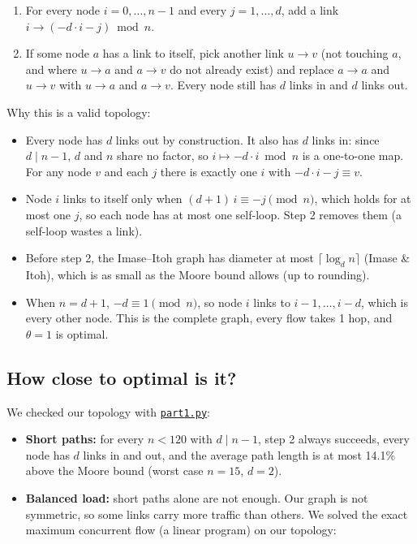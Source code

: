 \begin{enumerate}
  \item For every node $i = 0, \dots, n-1$ and every $j = 1, \dots, d$, add a link
        $i \rightarrow (-d \cdot i - j) \bmod n$.
  \item If some node $a$ has a link to itself, pick another link $u \rightarrow v$ (not touching
        $a$, and where $u \rightarrow a$ and $a \rightarrow v$ do not already exist) and replace
        $a \rightarrow a$ and $u \rightarrow v$ with $u \rightarrow a$ and $a \rightarrow v$.
        Every node still has $d$ links in and $d$ links out.
\end{enumerate}

Why this is a valid topology:
\begin{itemize}
  \item Every node has $d$ links out by construction. It also has $d$ links in: since $d \mid n-1$,
        $d$ and $n$ share no factor, so $i \mapsto -d \cdot i \bmod n$ is a one-to-one map. For any
        node $v$ and each $j$ there is exactly one $i$ with $-d \cdot i - j \equiv v$.
  \item Node $i$ links to itself only when $(d+1)\,i \equiv -j \pmod n$, which holds for at most one
        $j$, so each node has at most one self-loop. Step 2 removes them (a self-loop wastes a link).
  \item Before step 2, the Imase--Itoh graph has diameter at most $\lceil \log_d n \rceil$ (Imase \& Itoh),
        which is as small as the Moore bound allows (up to rounding).
  \item When $n = d + 1$, $-d \equiv 1 \pmod n$, so node $i$ links to $i-1, \dots, i-d$, which is every
        other node. This is the complete graph, every flow takes 1 hop, and $\theta = 1$ is optimal.
\end{itemize}

\subsection*{How close to optimal is it?}

We checked our topology with \href{\code/part1.py\#L72-L95}{\texttt{part1.py}}:
\begin{itemize}
  \item \textbf{Short paths:} for every $n < 120$ with $d \mid n-1$, step 2 always succeeds, every
        node has $d$ links in and out, and the average path length is at most 14.1\% above the
        Moore bound (worst case $n = 15$, $d = 2$).
  \item \textbf{Balanced load:} short paths alone are not enough. Our graph is not symmetric, so
        some links carry more traffic than others. We solved the exact maximum concurrent flow (a
        linear program) on our topology:
\end{itemize}

